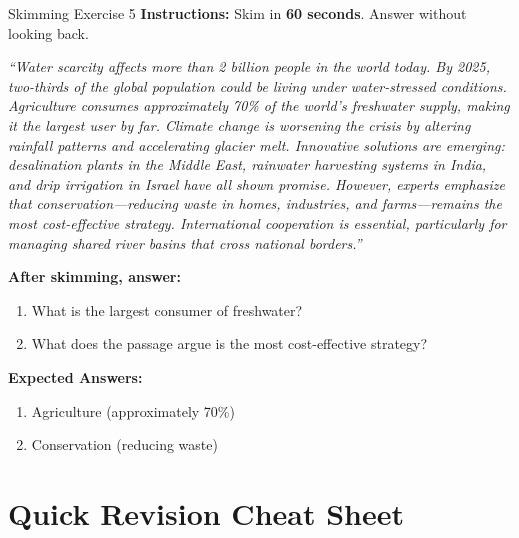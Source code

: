 \documentclass[12pt,a4paper]{article}
\begin{document}
\begin{practicebox}{Skimming Exercise 5}
\textbf{Instructions:} Skim in \textbf{60 seconds}. Answer without looking back.

\textit{``Water scarcity affects more than 2 billion people in the world today. By 2025, two-thirds of the global population could be living under water-stressed conditions. Agriculture consumes approximately 70\% of the world's freshwater supply, making it the largest user by far. Climate change is worsening the crisis by altering rainfall patterns and accelerating glacier melt. Innovative solutions are emerging: desalination plants in the Middle East, rainwater harvesting systems in India, and drip irrigation in Israel have all shown promise. However, experts emphasize that conservation---reducing waste in homes, industries, and farms---remains the most cost-effective strategy. International cooperation is essential, particularly for managing shared river basins that cross national borders.''}

\textbf{After skimming, answer:}
\begin{enumerate}[noitemsep]
    \item What is the largest consumer of freshwater?
    \item What does the passage argue is the most cost-effective strategy?
\end{enumerate}
\textbf{Expected Answers:}
\begin{enumerate}[noitemsep]
    \item Agriculture (approximately 70\%)
    \item Conservation (reducing waste)
\end{enumerate}
\end{practicebox}

\newpage

\section{Quick Revision Cheat Sheet}
\end{document}
